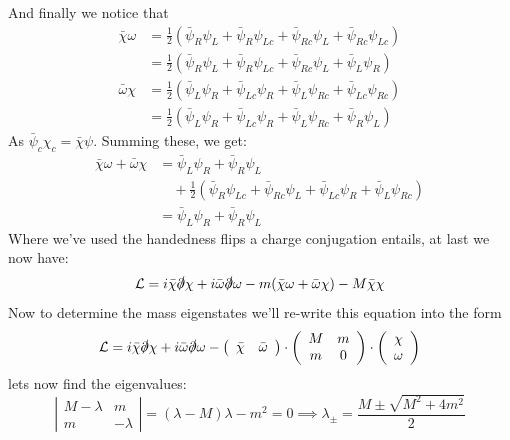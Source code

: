 \documentclass[11pt,a4paper,faculty=we,language=en,doctype=report]{cls/ugent-doc}
\begin{document}
And finally we notice that
\begin{align}
	\bar{\chi}\omega &= \frac{1}{2} \left(\bar{\psi}_R\psi_L + \bar{\psi}_R\psi_{Lc} + \bar{\psi}_{Rc}\psi_{L} + \bar{\psi}_{Rc}\psi_{Lc}\right)\\
	&=  \frac{1}{2} \left(\bar{\psi}_R\psi_L + \bar{\psi}_R\psi_{Lc} + \bar{\psi}_{Rc}\psi_{L} + \bar{\psi}_{L}\psi_{R}\right)\\
	\bar{\omega}\chi &= \frac{1}{2} \left(\bar{\psi}_L \psi_{R} + \bar{\psi}_{Lc}\psi_{R} + \bar{\psi}_L\psi_{Rc} + \bar{\psi}_{Lc}\psi_{Rc}\right)\\
	&= \frac{1}{2} \left(\bar{\psi}_L \psi_{R} + \bar{\psi}_{Lc}\psi_{R} + \bar{\psi}_L\psi_{Rc} + \bar{\psi}_{R}\psi_{L}\right)
\end{align}
As $\bar{\psi}_c\chi_c = \bar{\chi}\psi$. Summing these, we get:
\begin{align}
	\bar{\chi}\omega + \bar{\omega}\chi &= \bar{\psi}_L \psi_R + \bar{\psi}_R \psi_{L}\\
	&\quad + \frac{1}{2}\left(\bar{\psi}_R\psi_{Lc} + \bar{\psi}_{Rc} \psi_{L} + \bar{\psi}_{Lc}\psi_R + \bar{\psi}_L\psi_{Rc}\right)\\
	&= \bar{\psi}_L \psi_R + \bar{\psi}_R \psi_{L}
\end{align}
Where we've used the handedness flips a charge conjugation entails, at last we now have:
\begin{equation}
	\mathcal{L} = i\bar{\chi}\slashed{\partial}\chi +i\bar{\omega}\slashed{\partial}\omega - m(\bar{\chi}\omega + \bar{\omega}\chi) -M\bar{\chi} \chi 
\end{equation}
Now to determine the mass eigenstates we'll re-write this equation into the form
\begin{equation}
	\mathcal{L} = i\bar{\chi}\slashed{\partial}\chi +i\bar{\omega}\slashed{\partial}\omega 
	-\left(\begin{array}{cc}
		\bar{\chi} &\bar{\omega}
	\end{array}\right)\cdot
	\left(\begin{array}{cc}
		M & m \\
		m & 0
	\end{array}\right) \cdot \left(\begin{array}{c}
	\chi \\ \omega
\end{array}\right)
\end{equation}
lets now find the eigenvalues:
\begin{equation}
	\left| \begin{array}{cc}
		M-\lambda & m \\
		m & -\lambda
	\end{array} \right| = (\lambda-M)\lambda - m^2 = 0 \implies \lambda_\pm  = \frac{M\pm \sqrt{M^2 + 4m^2}}{2} \label{eigenvalues}
\end{equation}
\end{document}

